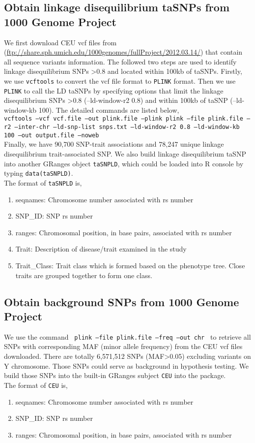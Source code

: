 \documentclass{article}
\begin{document}
\subsection{Obtain linkage disequilibrium taSNPs from 1000 Genome Project}
We first download CEU vcf files from
(\url{ftp://share.sph.umich.edu/1000genomes/fullProject/2012.03.14/}) that contain all sequence variants information. The followed two steps are used to identify linkage disequilibrium SNPs >0.8 and located within 100kb of taSNPs. Firstly, we use {\tt vcftools} to convert the vcf file format to {\tt PLINK} format. Then we use {\tt PLINK} to call the LD taSNPs by specifying options that limit the linkage disequilibrium SNPs >0.8 (--ld-window-r2 0.8) and within 100kb of taSNP (--ld-window-kb 100). The detailed commands are listed below,\\
\texttt{vcftools --vcf  vcf.file  --out plink.file --plink plink --file plink.file --r2 --inter-chr --ld-snp-list snps.txt --ld-window-r2 0.8 --ld-window-kb 100 --out output.file --noweb}\\
Finally, we have 90,700 SNP-trait associations and 78,247 unique linkage disequilibrium trait-associated SNP. We also build linkage disequilibrium taSNP into another GRanges object   \texttt{taSNPLD}, which could be loaded into R console by typing \texttt{data(taSNPLD)}.\\
The format of \texttt{taSNPLD} is,
\begin{enumerate}
\item seqnames: Chromosome number associated with rs number
\item  SNP\_ID: SNP rs number
\item  ranges: Chromosomal position, in base pairs, associated with rs number
\item  Trait: Description of disease/trait examined in the study
\item Trait\_Class: Trait class which is formed based on the phenotype tree. Close traits are grouped together to form one class.
\end{enumerate}


\subsection{Obtain background SNPs from 1000 Genome Project}
We use the command  \texttt{ plink --file plink.file  --freq --out chr } to retrieve all SNPs with corresponding MAF (minor allele frequency) from the CEU vcf files downloaded. There are totally 6,571,512 SNPs (MAF>0.05) excluding variants on Y chromosome. Those SNPs could serve as background in hypothesis testing. We build  those SNPs into the built-in GRanges subject \texttt{CEU} into the package.\\
The format of \texttt{CEU} is,
\begin{enumerate}
\item seqnames: Chromosome number associated with rs number
\item  SNP\_ID: SNP rs number
\item  ranges: Chromosomal position, in base pairs, associated with rs number
\end{enumerate}
\end{document}

